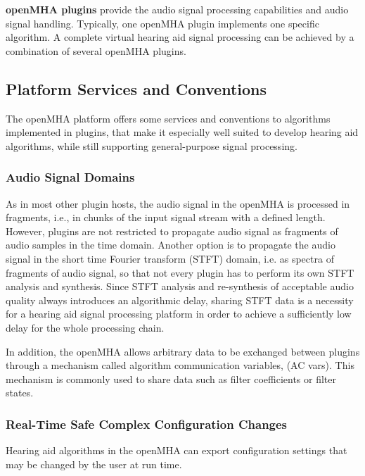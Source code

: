 {\bf openMHA plugins} provide the audio signal processing capabilities and audio signal handling. Typically, one openMHA plugin implements one specific algorithm. A complete virtual hearing aid signal processing can be achieved by a combination of several openMHA plugins.\subsection{Platform Services and Conventions}\label{index_pltf}
The openMHA platform offers some services and conventions to algorithms implemented in plugins, that make it especially well suited to develop hearing aid algorithms, while still supporting general-\/purpose signal processing.\subsubsection{Audio Signal Domains}\label{index_asd}
As in most other plugin hosts, the audio signal in the openMHA is processed in fragments, i.e., in chunks of the input signal stream with a defined length. However, plugins are not restricted to propagate audio signal as fragments of audio samples in the time domain. Another option is to propagate the audio signal in the short time Fourier transform (STFT) domain, i.e. as spectra of fragments of audio signal, so that not every plugin has to perform its own STFT analysis and synthesis. Since STFT analysis and re-\/synthesis of acceptable audio quality always introduces an algorithmic delay, sharing STFT data is a necessity for a hearing aid signal processing platform in order to achieve a sufficiently low delay for the whole processing chain.

In addition, the openMHA allows arbitrary data to be exchanged between plugins through a mechanism called algorithm communication variables, (AC vars). This mechanism is commonly used to share data such as filter coefficients or filter states.\subsubsection{Real-\/Time Safe Complex Configuration Changes}\label{index_rtscc}
Hearing aid algorithms in the openMHA can export configuration settings that may be changed by the user at run time.


